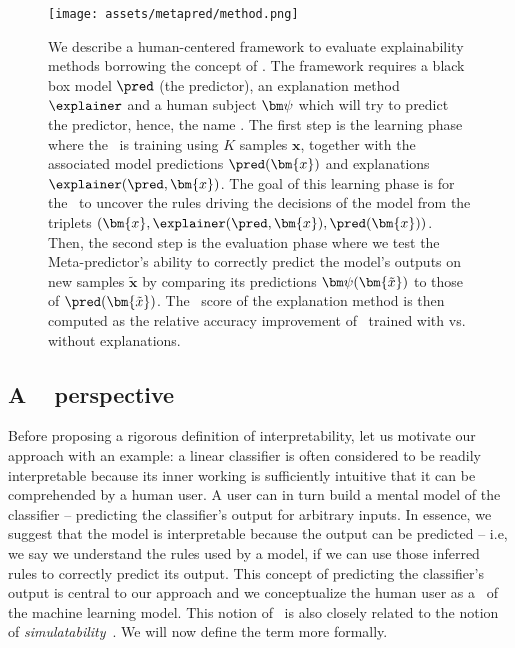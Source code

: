 \begin{figure*}[t!]
  \texttt{[image: assets/metapred/method.png]}

  \caption{
  We describe a human-centered framework to evaluate explainability methods borrowing the concept of \mp. 
  The framework requires a black box model $\pred$ (the predictor), an explanation method $\method$ and a human subject $\metapred$ which will try to predict the predictor, hence, the name \mp.
  The first step is the learning phase where the \mp~is training using $K$ samples $\bm{x}$, together with the associated model predictions $\pred(\bm{x})$ and explanations $\method(\pred, \bm{x})$. 
  The goal of this learning phase is for the \mp~to uncover the rules driving the decisions of the model from the triplets $(\bm{x}, \method(\pred, \bm{x}), \pred(\bm{x}))$.
  Then, the second step is the evaluation phase where we test the Meta-predictor's ability to correctly predict the model's outputs on new samples $\bm{\tilde{x}}$ by comparing its predictions $\metapred(\bm{\tilde{x}})$ to those of $\pred(\bm{\tilde{x}})$.
  The \metric~score of the explanation method is then computed as the relative accuracy improvement of \mp~trained with vs. without explanations.
  }
  \label{fig:metapred:metapred}
\end{figure*}


\subsection{A \mp~ perspective}

Before proposing a rigorous definition of interpretability, let us motivate our approach with an example: a linear classifier is often considered to be readily interpretable because its inner working is sufficiently intuitive that it can be comprehended by a human user. A user can in turn build a mental model of the classifier -- predicting the classifier's output for arbitrary inputs. 
In essence, we suggest that the model is interpretable because the output can be predicted -- i.e, we say we understand the rules used by a model, if we can use those inferred rules to correctly predict its output.
This concept of predicting the classifier's output is central to our approach and we conceptualize the human user as a \textit{\mp}~of the machine learning model. This notion of \mp~is also closely related to the notion of \textit{simulatability}~\cite{doshivelez2017rigorous, hase2020evaluating, pruthi2020evaluating, kim2016examples, fong2017perturbation}. 
We will now define the term more formally. 


